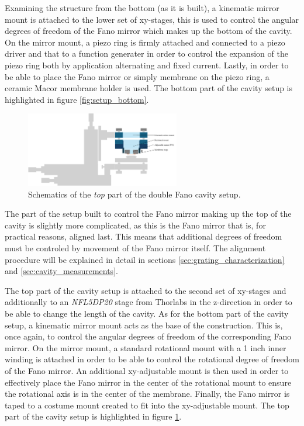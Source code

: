 Examining the structure from the bottom (as it is built), a kinematic mirror mount is attached to the lower set of xy-stages, this is used to control the angular degrees of freedom of the Fano mirror which makes up the bottom of the cavity. On the mirror mount, a piezo ring is firmly attached and connected to a piezo driver and that to a function generater in order to control the expansion of the piezo ring both by application alternating and fixed current. Lastly, in order to be able to place the Fano mirror or simply membrane on the  piezo ring, a ceramic Macor membrane holder is used. The bottom part of the cavity setup is highlighted in figure \ref{fig:setup_bottom}.

\begin{figure}[h!]
    \centering
    \includegraphics[width=0.6\textwidth]{figures/setup_top.pdf}
    \caption{Schematics of the \emph{top} part of the double Fano cavity setup.}
    \label{fig:setup_top}
\end{figure}

The part of the setup built to control the Fano mirror making up the top of the cavity is slightly more complicated, as this is the Fano mirror that is, for practical reasons, aligned last. This means that additional degrees of freedom must be controled by movement of the Fano mirror itself. The alignment procedure will be explained in detail in sections \ref{sec:grating_characterization} and \ref{sec:cavity_measurements}. 

The top part of the cavity setup is attached to the second set of xy-stages and additionally to an \emph{NFL5DP20} stage from Thorlabs in the z-direction in order to be able to change the length of the cavity. As for the bottom part of the cavity setup, a kinematic mirror mount acts as the base of the construction. This is, once again, to control the angular degrees of freedom of the corresponding Fano mirror. On the mirror mount, a standard rotational mount with a 1 inch inner winding is attached in order to be able to control the rotational degree of freedom of the Fano mirror. An additional xy-adjustable mount is then used in order to effectively place the Fano mirror in the center of the rotational mount to ensure the rotational axis is in the center of the membrane. Finally, the Fano mirror is taped to a costume mount created to fit into the xy-adjustable mount. The top part of the cavity setup is highlighted in figure \ref{fig:setup_top}.

